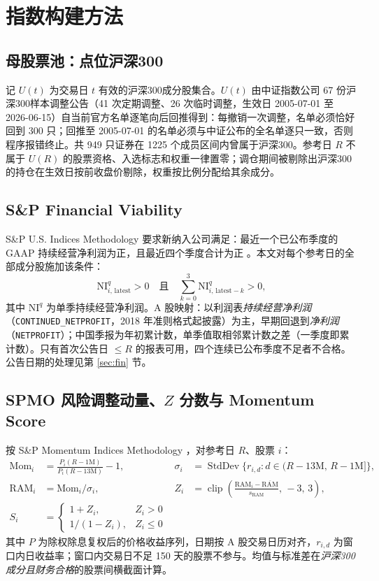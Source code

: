 \documentclass[11pt,a4paper]{article}
\newcommand{\RAM}{\mathrm{RAM}}
\begin{document}
\section{指数构建方法}\label{sec:method}
\FloatBarrier
\subsection{母股票池：点位沪深300}
记 $U(t)$ 为交易日 $t$ 有效的沪深300成分股集合。$U(t)$ 由中证指数公司 67 份沪深300样本调整公告（41 次定期调整、26 次临时调整，生效日 2005-07-01 至 2026-06-15）自当前官方名单逐笔向后回推得到：每撤销一次调整，名单必须恰好回到 300 只；回推至 2005-07-01 的名单必须与中证公布的全名单逐只一致，否则程序报错终止。共 949 只证券在 1225 个成员区间内曾属于沪深300。参考日 $R$ 不属于 $U(R)$ 的股票资格、入选标志和权重一律置零；调仓期间被剔除出沪深300的持仓在生效日按前收盘价剔除，权重按比例分配给其余成分。
\FloatBarrier
\subsection{S\&P Financial Viability}
S\&P U.S. Indices Methodology 要求新纳入公司满足：最近一个已公布季度的 GAAP 持续经营净利润为正，且最近四个季度合计为正 \cite{spdji_us}。本文对每个参考日的全部成分股施加该条件：\begin{equation}\mathrm{NI}^{q}_{i,\,\mathrm{latest}} > 0 \quad\text{且}\quad \sum_{k=0}^{3}\mathrm{NI}^{q}_{i,\,\mathrm{latest}-k} > 0 ,\end{equation}其中 $\mathrm{NI}^{q}$ 为单季持续经营净利润。A 股映射：以利润表\emph{持续经营净利润}（\texttt{CONTINUED\_NETPROFIT}，2018 年准则格式起披露）为主，早期回退到\emph{净利润}（\texttt{NETPROFIT}）；中国季报为年初累计数，单季值取相邻累计数之差（一季度即累计数）。只有首次公告日 $\leq R$ 的报表可用，四个连续已公布季度不足者不合格。公告日期的处理见第 \ref{sec:fin} 节。
\FloatBarrier
\subsection{SPMO 风险调整动量、$Z$ 分数与 Momentum Score}
按 S\&P Momentum Indices Methodology \cite{spdji_momentum}，对参考日 $R$、股票 $i$：\begin{align}\mathrm{Mom}_i &= \frac{P_i(R - 1\mathrm{M})}{P_i(R - 13\mathrm{M})} - 1, &\sigma_i &= \operatorname{StdDev}\bigl\{r_{i,d}: d \in (R-13\mathrm{M},\, R-1\mathrm{M}]\bigr\}, \\\RAM_i &= \mathrm{Mom}_i / \sigma_i, &Z_i &= \operatorname{clip}\!\left(\frac{\RAM_i - \overline{\RAM}}{s_{\RAM}},\, -3,\, 3\right), \\S_i &= \begin{cases} 1 + Z_i, & Z_i > 0 \\ 1/(1 - Z_i), & Z_i \leq 0 \end{cases}\end{align}其中 $P$ 为除权除息复权后的价格收益序列，日期按 A 股交易日历对齐，$r_{i,d}$ 为窗口内日收益率；窗口内交易日不足 150 天的股票不参与。均值与标准差在\emph{沪深300成分且财务合格}的股票间横截面计算。
\FloatBarrier
\end{document}
